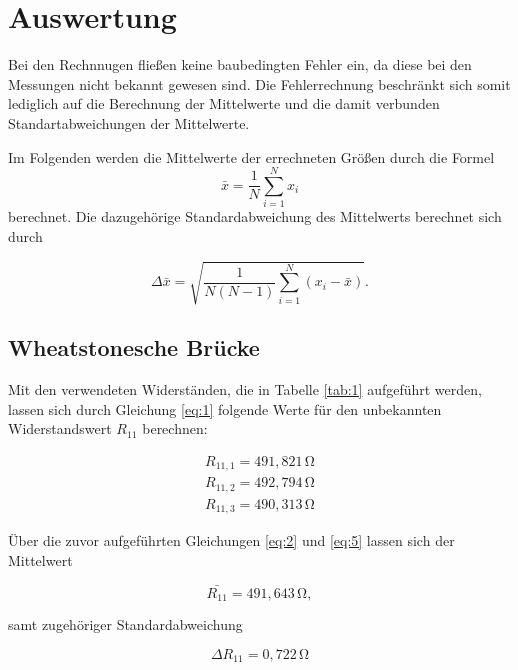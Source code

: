 \section{Auswertung}
\label{sec:Auswertung}
\noindent
Bei den Rechnnugen fließen keine baubedingten Fehler ein, da diese bei den Messungen
nicht bekannt gewesen sind. Die Fehlerrechnung beschränkt sich somit lediglich auf die 
Berechnung der Mittelwerte und die damit verbunden Standartabweichungen der Mittelwerte.

\noindent
Im Folgenden werden die Mittelwerte 
der errechneten Größen durch die Formel
\begin{equation}
    \bar{x}=\frac{1}{N}\sum_{i=1}^N x_i
    \label{eq:2}
\end{equation}
berechnet. Die dazugehörige Standardabweichung
des Mittelwerts berechnet sich durch

 \begin{equation}
     \Delta\bar{x}=\sqrt{\frac{1}{N(N-1)}\sum_{i=1}^N (x_i-\bar{x})}.
     \label{eq:5}
 \end{equation}


\subsection{Wheatstonesche Brücke}
\label{WheatstonescheBrücke}

Mit den verwendeten Widerständen, die in Tabelle \ref{tab:1} aufgeführt werden, 
lassen sich durch Gleichung \ref{eq:1} folgende Werte für den 
unbekannten Widerstandswert $R_{11}$ berechnen:

\begin{align}
R_{11,1} = 491,821\,\si{\ohm} \nonumber \\
R_{11,2} = 492,794\,\si{\ohm} \nonumber \\
R_{11,3} = 490,313\,\si{\ohm} \nonumber 
\end{align}

\noindent
Über die zuvor aufgeführten Gleichungen \ref{eq:2} und \ref{eq:5} lassen sich der  
Mittelwert 

\begin{equation}
\bar{R_{11}} = 491,643\,\si{\ohm}, \nonumber
\end{equation}

\noindent
samt zugehöriger Standardabweichung

\begin{equation}
\Delta R_{11} = 0,722\, \si{\ohm} \nonumber
\end{equation}

